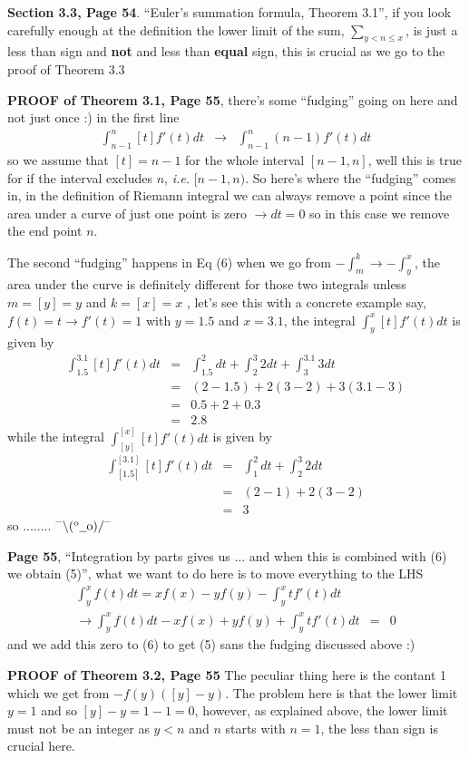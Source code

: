 \documentclass[aps,preprint,preprintnumbers,nofootinbib,showpacs,prd]{revtex4-1}
\newcommand{\ie}{{\it i.e.} }
\newcommand{\nbea}{\begin{eqnarray*}}
\newcommand{\neea}{\end{eqnarray*}}
\newcommand{\dunno}{$ {}^{\mbox {--}}\backslash(^{\rm o}{}\underline{\hspace{0.2cm}}{\rm o})/^{\mbox {--}}$}
\begin{document}
{\bf Section 3.3, Page 54}. ``Euler's summation formula, Theorem 3.1'', if you look carefully enough at the definition the lower limit of the sum, $\sum_{y<n\le x}$, is just a less than sign and {\bf not} and less than {\bf equal} sign, this is crucial as we go to the proof of Theorem 3.3

{\bf PROOF of Theorem 3.1, Page 55}, there's some ``fudging'' going on here and not just once :) in the first line
%
\nbea
\int_{n-1}^{n}[t] f'(t)dt & \to & \int_{n-1}^n (n-1)f'(t)dt
\neea
%
so we assume that $[t] = n-1$ for the whole interval $[n-1,n]$, well this is true for if the interval excludes $n$, \ie $[n-1,n)$. So here's where the ``fudging'' comes in, in the definition of Riemann integral we can always remove a point since the area under a curve of just one point is zero $\to dt = 0$ so in this case we remove the end point $n$.

The second ``fudging'' happens in Eq (6) when we go from $-\int_m^k \to -\int_y^x$, the area under the curve is definitely different for those two integrals unless $m=[y]=y$ and $k=[x]=x$ , let's see this with a concrete example say, $f(t) = t \to f'(t) = 1$ with $y = 1.5$ and $x = 3.1$, the integral $\int_y^x[t]f'(t)dt$ is given by
%
\nbea
\int_{1.5}^{3.1}[t]f'(t)dt & = & \int_{1.5}^{2}dt + \int_{2}^{3}2dt+  \int_{3}^{3.1}3dt \\
& = & (2-1.5) + 2(3-2) + 3(3.1-3) \\
& = & 0.5 + 2 + 0.3 \\
& = & 2.8
\neea
%
while the integral $\int_{[y]}^{[x]}[t]f'(t)dt$ is given by
%
\nbea
\int_{[1.5]}^{[3.1]}[t]f'(t)dt & = & \int_{1}^{2}dt + \int_{2}^{3}2dt \\
& = & (2-1) + 2(3-2) \\
& = & 3
\neea
%
so ........ \dunno

{\bf Page 55}, ``Integration by parts gives us $\dots$ and when this is combined with (6) we obtain (5)'', what we want to do here is to move everything to the LHS
%
\nbea
\int_y^x f(t)dt = xf(x) - yf(y) - \int_y^xtf'(t)dt \\
\to \int_y^x f(t)dt - xf(x) + yf(y) + \int_y^xtf'(t)dt & = & 0
\neea
%
and we add this zero to (6) to get (5) sans the fudging discussed above :)

{\bf PROOF of Theorem 3.2, Page 55} The peculiar thing here is the contant 1 which we get from $-f(y)([y]-y)$. The problem here is that the lower limit $y = 1$ and so $[y]-y = 1-1=0$, however, as explained above, the lower limit must not be an integer as $y < n$ and $n$ starts with $n=1$, the less than sign is crucial here.
\end{document}
